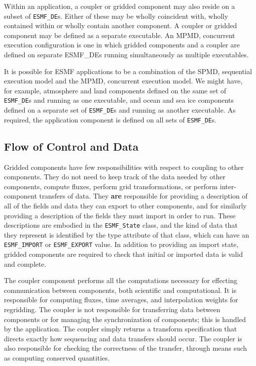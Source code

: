 Within an application, a coupler or gridded component may also reside on 
a subset of {\tt ESMF\_DE}s.  Either of these may be wholly coincident with, 
wholly 
contained within or wholly contain another component.  A coupler or gridded
component may be defined as a separate executable.  An MPMD, concurrent
execution configuration is one in which gridded components and 
a coupler are defined on separate ESMF\_DEs running simultaneously as multiple 
executables.

It is possible for ESMF applications to be a combination of the SPMD, 
sequential 
execution model and the MPMD, concurrent execution model.  We might have,
for example, atmosphere and land components defined on the same set of 
{\tt ESMF\_DE}s and running as one executable, and ocean and sea ice 
components defined on a separate set of {\tt ESMF\_DE}s and running as 
another executable.  As required, the application component is defined
on all sets of {\tt ESMF\_DE}s.

\subsection{Flow of Control and Data}

Gridded components have few responsibilities with respect to coupling
to other components.  They do not need to keep track of the data needed
by other components, compute fluxes, perform grid transformations, or 
perform inter-component transfers of data.  They {\bf are} responsible for 
providing a description of all of the fields and data they
can export to other components, and for similarly providing a description 
of the fields they must import in order to run.  These descriptions are
embodied in the {\tt ESMF\_State} class, and the kind of data that they 
represent is identified by the type attribute of that class, which can
have an {\tt ESMF\_IMPORT} or {\tt ESMF\_EXPORT} value.  In addition to 
providing an import state, gridded components are required to check that 
initial or imported data is valid and complete.

The coupler component performs all the computations necessary for effecting
communication between components, both scientific and computational.  
It is responsible for computing fluxes, time averages, and interpolation 
weights for regridding.  The coupler is not responsible for transferring
data between components or for managing the synchronization of components;
this is handled by the application.  The coupler simply returns a transform 
specification that directs exactly how sequencing and data transfers should 
occur.  The coupler is also responsible for checking the correctness of 
the transfer, through means such as computing conserved quantities.

